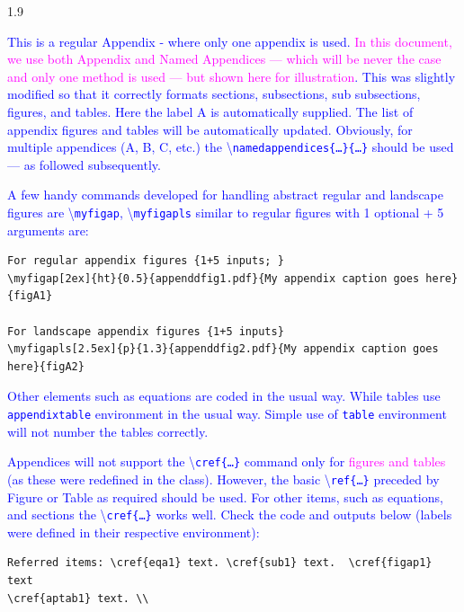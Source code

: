 \documentclass[phd]{ndsu-thesis-2022}
\newcommand\myspacing{1.9}      %
\newcommand\italk[1]{\textcolor{blue}{#1}}  %
\newcommand\cmd[1]{\textbackslash\texttt{#1}}  %
\begin{document}
\begin{spacing}{\myspacing}
\label{biblio}


\appendix %

\italk{This is a regular Appendix - where only one appendix is used. \textcolor{magenta}{In this document, we use both Appendix and Named Appendices --- which will be never the case and only one method is used --- but shown here for illustration}. This was slightly modified so that it correctly formats sections, subsections, sub subsections, figures, and tables. Here the label A is automatically supplied. The list of appendix figures and tables will be automatically updated. Obviously, for multiple appendices (A, B, C, etc.) the \cmd{namedappendices\{\ldots\}\{\ldots\}} should be used --- as followed subsequently.}

\italk{A few handy commands developed for handling abstract regular and landscape figures are \cmd{myfigap}, \cmd{myfigapls} similar to regular figures with 1 optional + 5 arguments are: } 

\label{figv}
\vspace{2ex}
{\singlespacing
\begin{verbatim}
For regular appendix figures {1+5 inputs; }
\myfigap[2ex]{ht}{0.5}{appenddfig1.pdf}{My appendix caption goes here}{figA1}

For landscape appendix figures {1+5 inputs}
\myfigapls[2.5ex]{p}{1.3}{appenddfig2.pdf}{My appendix caption goes here}{figA2}
\end{verbatim}
}

\italk{Other elements such as equations are coded in the usual way. While tables use \texttt{appendixtable} environment in the usual way. Simple use of \texttt{table} environment will not number the tables correctly.}

\italk{Appendices will not support the \cmd{cref\{\ldots\}} command only for \textcolor{magenta}{figures and tables} (as these were redefined in the class). However, the basic \cmd{ref\{\ldots\}} preceded by Figure or Table as required should be used. For other items, such as equations, and sections the \cmd{cref\{\ldots\}} works well. Check the code and outputs below (labels were defined in their respective environment):}

{\singlespacing
\begin{verbatim}
Referred items: \cref{eqa1} text. \cref{sub1} text.  \cref{figap1} text 
\cref{aptab1} text. \\


\end{verbatim}}
\end{spacing}
\end{document}
